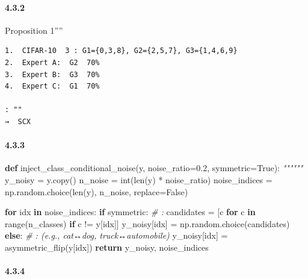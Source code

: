 \documentclass[
  12pt,
]{article}
\newenvironment{Shaded}{}{}
\newcommand{\BuiltInTok}[1]{\textcolor[rgb]{0.00,0.50,0.00}{#1}}
\newcommand{\CommentTok}[1]{\textcolor[rgb]{0.38,0.63,0.69}{\textit{#1}}}
\newcommand{\ControlFlowTok}[1]{\textcolor[rgb]{0.00,0.44,0.13}{\textbf{#1}}}
\newcommand{\FloatTok}[1]{\textcolor[rgb]{0.25,0.63,0.44}{#1}}
\newcommand{\KeywordTok}[1]{\textcolor[rgb]{0.00,0.44,0.13}{\textbf{#1}}}
\newcommand{\NormalTok}[1]{#1}
\newcommand{\OperatorTok}[1]{\textcolor[rgb]{0.40,0.40,0.40}{#1}}
\newcommand{\VariableTok}[1]{\textcolor[rgb]{0.10,0.09,0.49}{#1}}
\begin{document}
\paragraph{4.3.2
}\label{ux4e13ux5bb6ux5deeux5f02ux653eux5927}

 Proposition 1''''

\begin{verbatim}
1.  CIFAR-10  3 : G1={0,3,8}, G2={2,5,7}, G3={1,4,6,9}
2.  Expert A:  G2  70% 
3.  Expert B:  G3  70% 
4.  Expert C:  G1  70% 

: ""
→  SCX 
\end{verbatim}

\paragraph{4.3.3
}\label{ux6807ux7b7eux566aux58f0ux6ce8ux5165}

\begin{Shaded}
\begin{Highlighting}[]
\KeywordTok{def}\NormalTok{ inject\_class\_conditional\_noise(y, noise\_ratio}\OperatorTok{=}\FloatTok{0.2}\NormalTok{, symmetric}\OperatorTok{=}\VariableTok{True}\NormalTok{):}
    \CommentTok{""""""}
\NormalTok{    y\_noisy }\OperatorTok{=}\NormalTok{ y.copy()}
\NormalTok{    n\_noise }\OperatorTok{=} \BuiltInTok{int}\NormalTok{(}\BuiltInTok{len}\NormalTok{(y) }\OperatorTok{*}\NormalTok{ noise\_ratio)}
\NormalTok{    noise\_indices }\OperatorTok{=}\NormalTok{ np.random.choice(}\BuiltInTok{len}\NormalTok{(y), n\_noise, replace}\OperatorTok{=}\VariableTok{False}\NormalTok{)}

    \ControlFlowTok{for}\NormalTok{ idx }\KeywordTok{in}\NormalTok{ noise\_indices:}
        \ControlFlowTok{if}\NormalTok{ symmetric:}
            \CommentTok{\# : }
\NormalTok{            candidates }\OperatorTok{=}\NormalTok{ [c }\ControlFlowTok{for}\NormalTok{ c }\KeywordTok{in} \BuiltInTok{range}\NormalTok{(n\_classes) }\ControlFlowTok{if}\NormalTok{ c }\OperatorTok{!=}\NormalTok{ y[idx]]}
\NormalTok{            y\_noisy[idx] }\OperatorTok{=}\NormalTok{ np.random.choice(candidates)}
        \ControlFlowTok{else}\NormalTok{:}
            \CommentTok{\# :  (e.g., cat↔dog, truck↔automobile)}
\NormalTok{            y\_noisy[idx] }\OperatorTok{=}\NormalTok{ asymmetric\_flip(y[idx])}
    \ControlFlowTok{return}\NormalTok{ y\_noisy, noise\_indices}
\end{Highlighting}
\end{Shaded}

\paragraph{4.3.4 }\label{ux5197ux4f59ux6ce8ux5165-1}
\end{document}
